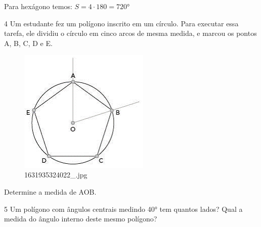 \begin{escolha}
\begin{boxmedio}
\begin{boxmedio}
{\begin{boxpeq}
\begin{boxpeq}
{\begin{boxpeq}
\begin{boxmedio}
\begin{boxmedio}
\begin{boxpeq}
\begin{boxmedio}
\begin{boxpeq}
\begin{boxpeq}
\begin{boxpeq}
\begin{boxpeq}
\begin{boxmedio}
{\begin{boxmedio}
\begin{boxmedio}
\begin{boxpeq}
\begin{boxmedio}
\begin{boxpeq}
\begin{boxpeq}
\begin{boxpeq}
\begin{escolha}
{\begin{boxmedio}
\begin{boxpeq}
\begin{boxpeq}
\begin{boxpeq}
\begin{boxpeq}
\begin{boxpeq}
\begin{boxmedio}
\begin{boxpeq}
\begin{boxpeq}
\begin{boxpeq}
{\begin{boxpeq}
\begin{boxmedio}
\begin{boxpeq}
\begin{boxpeq}
\begin{boxpeq}
{\begin{boxpeq}
\begin{boxmedio}
{\begin{boxpeq}
\begin{boxpeq}
\begin{boxmedio}
\begin{boxmedio}
\begin{boxpeq}
\begin{boxpeq}
{\begin{boxpeq}
\begin{boxpeq}
\begin{boxpeq}
\begin{boxpeq}
\begin{boxpeq}
\begin{escolha}
\begin{escolha}
{\begin{boxmedio}
\begin{boxpeq}
\begin{q°}
\begin{boxmedio}
{Para hexágono temos: $S = 4 \cdot 180 = 720$°}

\num{4} Um estudante fez um polígono inscrito em um círculo. Para executar
essa tarefa, ele dividiu o círculo em cinco arcos de mesma medida, e
marcou os pontos A, B, C, D e E.

\begin{figure}
\centering
\includegraphics[width=2.45291in,height=2.3178in]{./_SAEB_9_MAT/media/image188.png}
\caption{1631935324022\_.jpg}
\end{figure}

Determine a medida de AOB.

\begin{boxpeq}


\num{5} Um polígono com ângulos centrais medindo 40° tem quantos lados? Qual
a medida do ângulo interno deste mesmo polígono?


\end{boxpeq}
\end{boxmedio}
\end{q°}
\end{boxpeq}
\end{boxmedio}}
\end{escolha}
\end{escolha}
\end{boxpeq}
\end{boxpeq}
\end{boxpeq}
\end{boxpeq}
\end{boxpeq}}
\end{boxpeq}
\end{boxpeq}
\end{boxmedio}
\end{boxmedio}
\end{boxpeq}
\end{boxpeq}}
\end{boxmedio}
\end{boxpeq}}
\end{boxpeq}
\end{boxpeq}
\end{boxpeq}
\end{boxmedio}
\end{boxpeq}}
\end{boxpeq}
\end{boxpeq}
\end{boxpeq}
\end{boxmedio}
\end{boxpeq}
\end{boxpeq}
\end{boxpeq}
\end{boxpeq}
\end{boxpeq}
\end{boxmedio}}
\end{escolha}
\end{boxpeq}
\end{boxpeq}
\end{boxpeq}
\end{boxmedio}
\end{boxpeq}
\end{boxmedio}
\end{boxmedio}}
\end{boxmedio}
\end{boxpeq}
\end{boxpeq}
\end{boxpeq}
\end{boxpeq}
\end{boxmedio}
\end{boxpeq}
\end{boxmedio}
\end{boxmedio}
\end{boxpeq}}
\end{boxpeq}
\end{boxpeq}}
\end{boxmedio}
\end{boxmedio}
\end{escolha}
